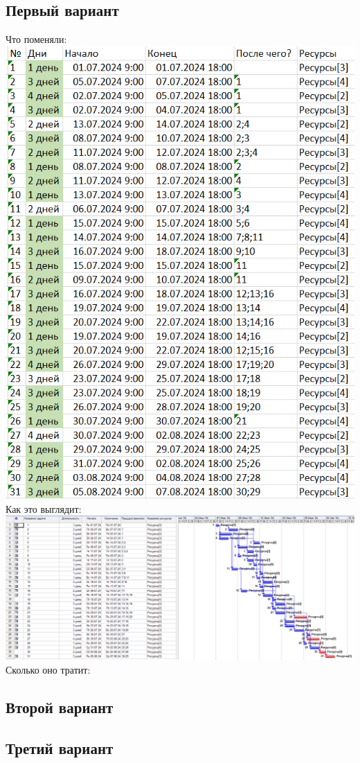 \documentclass[14pt]{article}
\begin{document}
	\subsection{Первый вариант}
		\LARGE Что поменяли:\\
		\includegraphics[height=0.6\textheight]{../img/1a1_days_change.png}\\ 
		Как это выглядит:\\
		\includegraphics[width=\textwidth]{../img/ot1a1_1.png}\\ 
		Сколько оно тратит:\\
		
	\subsection{Второй вариант}
	\subsection{Третий вариант}
\end{document}
